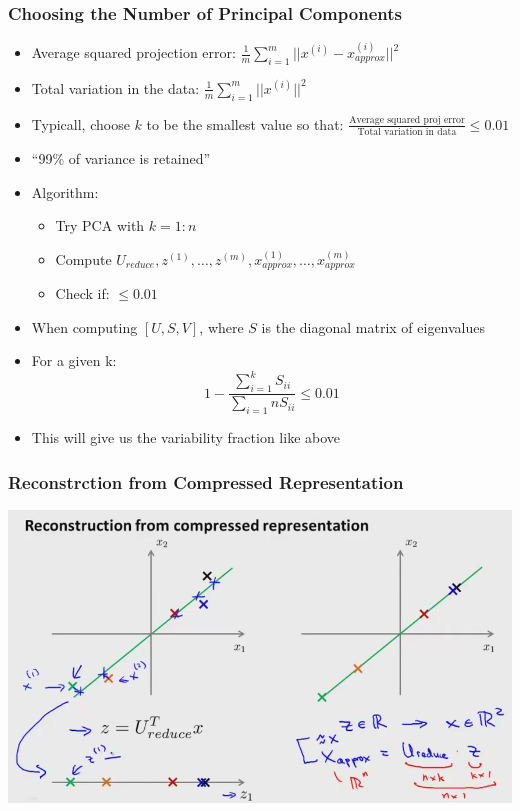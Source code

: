 \subsubsection{Choosing the Number of Principal Components}
\begin{itemize}[--]
	\item Average squared projection error: $\frac{1}{m}\sum_{i=1}^{m} ||x^{(i)}- x_{approx}^{(i)} ||^2$
	\item Total variation in the data: $\frac{1}{m}\sum_{i=1}^{m}||x^{(i)}||^2$
	\item Typicall, choose $k$ to be the smallest value so that:
		$\frac{\text{Average squared proj error}}{\text{Total variation in data}}\leq 0.01$
	\item ``99\% of variance is retained''
	\item Algorithm:
	\begin{itemize}[--]
		\item Try PCA with $k=1:n$
		\item Compute $U_{reduce}, z^{(1)}, \ldots, z^{(m)}, x^{(1)}_{approx},\ldots, x^{(m)}_{approx}$
		\item Check if: $\leq 0.01$
	\end{itemize}

	\item When computing $[U, S, V]$, where $S$ is the diagonal matrix of eigenvalues
	\item For a given k:
		$$1-\frac{\sum_{i=1}^{k} S_{ii}}{\sum_{i=1}{n} S_{ii}}\leq 0.01$$
	\item This will give us the variability fraction like above
\end{itemize}

\subsubsection{Reconstrction from Compressed Representation}
\begin{center}
	\includegraphics[scale=0.5]{sections/cs229/w11/reduce.png}
\end{center}
 
